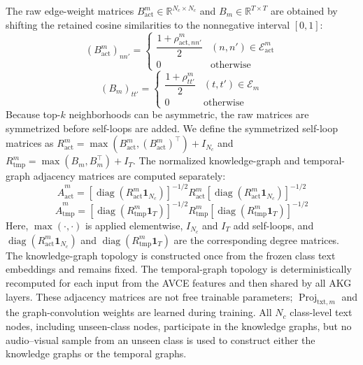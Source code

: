 \documentclass[10pt,journal,twoside]{IEEEtran}
\begin{document}
The raw edge-weight matrices $B_{\mathrm{act}}^m\in\mathbb{R}^{N_c\times N_c}$ and $B_m\in\mathbb{R}^{T\times T}$ are obtained by shifting the retained cosine similarities to the nonnegative interval $[0,1]$:
\begin{equation}
\left(B_{\mathrm{act}}^m\right)_{nn'}=
\begin{cases}
\dfrac{1+\rho_{\mathrm{act},nn'}^m}{2} & (n,n')\in\mathcal{E}_{\mathrm{act}}^m\\
0 & \text{otherwise}
\end{cases}
\end{equation}
\begin{equation}
\left(B_m\right)_{tt'}=
\begin{cases}
\dfrac{1+\rho_{tt'}^m}{2} & (t,t')\in\mathcal{E}_m\\
0 & \text{otherwise}
\end{cases}
\end{equation}
Because top-$k$ neighborhoods can be asymmetric, the raw matrices are symmetrized before self-loops are added. We define the symmetrized self-loop matrices as $R_{\mathrm{act}}^m=\max(B_{\mathrm{act}}^m,(B_{\mathrm{act}}^m)^{\top})+I_{N_c}$ and $R_{\mathrm{tmp}}^m=\max(B_m,B_m^{\top})+I_T$. The normalized knowledge-graph and temporal-graph adjacency matrices are computed separately:
\begin{equation}
\widehat A_{\mathrm{act}}^m = \left[\operatorname{diag}\left(R_{\mathrm{act}}^m\mathbf{1}_{N_c}\right)\right]^{-1/2}
R_{\mathrm{act}}^m
\left[\operatorname{diag}\left(R_{\mathrm{act}}^m\mathbf{1}_{N_c}\right)\right]^{-1/2}
\end{equation}
\begin{equation}
\widehat A_{\mathrm{tmp}}^m = \left[\operatorname{diag}\left(R_{\mathrm{tmp}}^m\mathbf{1}_{T}\right)\right]^{-1/2}
R_{\mathrm{tmp}}^m
\left[\operatorname{diag}\left(R_{\mathrm{tmp}}^m\mathbf{1}_{T}\right)\right]^{-1/2}
\end{equation}
Here, $\max(\cdot,\cdot)$ is applied elementwise, $I_{N_c}$ and $I_T$ add self-loops, and $\operatorname{diag}(R_{\mathrm{act}}^m\mathbf{1}_{N_c})$ and $\operatorname{diag}(R_{\mathrm{tmp}}^m\mathbf{1}_T)$ are the corresponding degree matrices. The knowledge-graph topology is constructed once from the frozen class text embeddings and remains fixed. The temporal-graph topology is deterministically recomputed for each input from the AVCE features and then shared by all AKG layers. These adjacency matrices are not free trainable parameters; $\operatorname{Proj}_{\mathrm{txt},m}$ and the graph-convolution weights are learned during training. All $N_c$ class-level text nodes, including unseen-class nodes, participate in the knowledge graphs, but no audio--visual sample from an unseen class is used to construct either the knowledge graphs or the temporal graphs.
\end{document}
